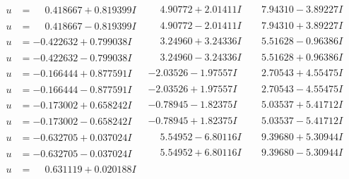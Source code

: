 \documentclass[1p]{elsarticle_modified}
\theoremstyle{definition}
\begin{document}
$$\begin{array}{c|c|c}
\begin{aligned}
u &= \phantom{-}0.418667 + 0.819399 I\end{aligned}
 & \phantom{-}4.90772 + 2.01411 I & \phantom{-}7.94310 - 3.89227 I \\ \hline\begin{aligned}
u &= \phantom{-}0.418667 - 0.819399 I\end{aligned}
 & \phantom{-}4.90772 - 2.01411 I & \phantom{-}7.94310 + 3.89227 I \\ \hline\begin{aligned}
u &= -0.422632 + 0.799038 I\end{aligned}
 & \phantom{-}3.24960 + 3.24336 I & \phantom{-}5.51628 - 0.96386 I \\ \hline\begin{aligned}
u &= -0.422632 - 0.799038 I\end{aligned}
 & \phantom{-}3.24960 - 3.24336 I & \phantom{-}5.51628 + 0.96386 I \\ \hline\begin{aligned}
u &= -0.166444 + 0.877591 I\end{aligned}
 & -2.03526 - 1.97557 I & \phantom{-}2.70543 + 4.55475 I \\ \hline\begin{aligned}
u &= -0.166444 - 0.877591 I\end{aligned}
 & -2.03526 + 1.97557 I & \phantom{-}2.70543 - 4.55475 I \\ \hline\begin{aligned}
u &= -0.173002 + 0.658242 I\end{aligned}
 & -0.78945 - 1.82375 I & \phantom{-}5.03537 + 5.41712 I \\ \hline\begin{aligned}
u &= -0.173002 - 0.658242 I\end{aligned}
 & -0.78945 + 1.82375 I & \phantom{-}5.03537 - 5.41712 I \\ \hline\begin{aligned}
u &= -0.632705 + 0.037024 I\end{aligned}
 & \phantom{-}5.54952 - 6.80116 I & \phantom{-}9.39680 + 5.30944 I \\ \hline\begin{aligned}
u &= -0.632705 - 0.037024 I\end{aligned}
 & \phantom{-}5.54952 + 6.80116 I & \phantom{-}9.39680 - 5.30944 I \\ \hline\begin{aligned}
u &= \phantom{-}0.631119 + 0.020188 I\end{aligned}

\end{array}$$
\end{document}
